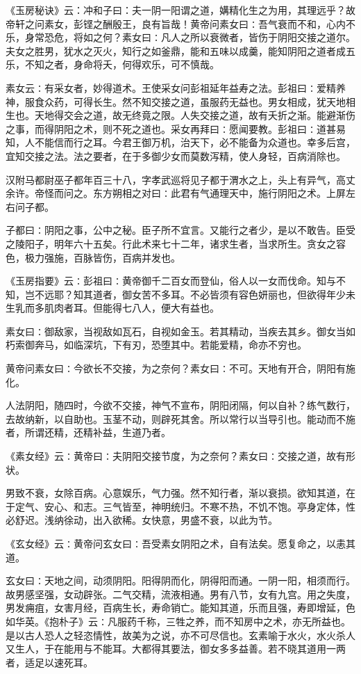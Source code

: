 \documentclass[a4paper,12pt,UTF8,twoside]{ctexbook}
\begin{document}
《玉房秘诀》云：冲和子曰：夫一阴一阳谓之道，媾精化生之为用，其理远乎？故帝轩之问素女，彭铿之酬殷王，良有旨哉！黄帝问素女曰∶吾气衰而不和，心内不乐，身常恐危，将如之何？素女曰∶凡人之所以衰微者，皆伤于阴阳交接之道尔。夫女之胜男，犹水之灭火，知行之如釜鼎，能和五味以成羹，能知阴阳之道者成五乐，不知之者，身命将夭，何得欢乐，可不慎哉。

素女云∶有采女者，妙得道术。王使采女问彭祖延年益寿之法。彭祖曰∶爱精养神，服食众药，可得长生。然不知交接之道，虽服药无益也。男女相成，犹天地相生也。天地得交会之道，故无终竟之限。人失交接之道，故有夭折之渐。能避渐伤之事，而得阴阳之术，则不死之道也。采女再拜曰∶愿闻要教。彭祖曰∶道甚易知，人不能信而行之耳。今君王御万机，治天下，必不能备为众道也。幸多后宫，宜知交接之法。法之要者，在于多御少女而莫数泻精，使人身轻，百病消除也。

汉附马都尉巫子都年百三十八，字孝武巡将见子都于渭水之上，头上有异气，高丈余许。帝怪而问之。东方朔相之对曰∶此君有气通理天中，施行阴阳之术。上屏左右问子都。

子都曰∶阴阳之事，公中之秘。臣子所不宜言。又能行之者少，是以不敢告。臣受之陵阳子，明年六十五矣。行此术来七十二年，诸求生者，当求所生。贪女之容色，极力强施，百脉皆伤，百病并发也。

《玉房指要》云∶彭祖曰∶黄帝御千二百女而登仙，俗人以一女而伐命。知与不知，岂不远耶？知其道者，御女苦不多耳。不必皆须有容色妍丽也，但欲得年少未生乳而多肌肉者耳。但能得七八人，便大有益也。

素女曰∶御敌家，当视敌如瓦石，自视如金玉。若其精动，当疾去其乡。御女当如朽索御奔马，如临深坑，下有刃，恐堕其中。若能爱精，命亦不穷也。

黄帝问素女曰∶今欲长不交接，为之奈何？素女曰∶不可。天地有开合，阴阳有施化。

人法阴阳，随四时，今欲不交接，神气不宣布，阴阳闭隔，何以自补？练气数行，去故纳新，以自助也。玉茎不动，则辟死其舍。所以常行以当导引也。能动而不施者，所谓还精，还精补益，生道乃者。

《素女经》云∶黄帝曰∶夫阴阳交接节度，为之奈何？素女曰∶交接之道，故有形状。

男致不衰，女除百病。心意娱乐，气力强。然不知行者，渐以衰损。欲知其道，在于定气、安心、和志。三气皆至，神明统归。不寒不热，不饥不饱。亭身定体，性必舒迟。浅纳徐动，出入欲稀。女快意，男盛不衰，以此为节。

《玄女经》云∶黄帝问玄女曰∶吾受素女阴阳之术，自有法矣。愿复命之，以恚其道。

玄女曰∶天地之间，动须阴阳。阳得阴而化，阴得阳而通。一阴一阳，相须而行。故男感坚强，女动辟张。二气交精，流液相通。男有八节，女有九宫。用之失度，男发痈疽，女害月经，百病生长，寿命销亡。能知其道，乐而且强，寿即增延，色如华英。《抱朴子》云∶凡服药千称，三牲之养，而不知房中之术，亦无所益也。是以古人恐人之轻恣情性，故美为之说，亦不可尽信也。玄素喻于水火，水火杀人又生人，于在能用与不能耳。大都得其要法，御女多多益善。若不晓其道用一两者，适足以速死耳。
\end{document}
